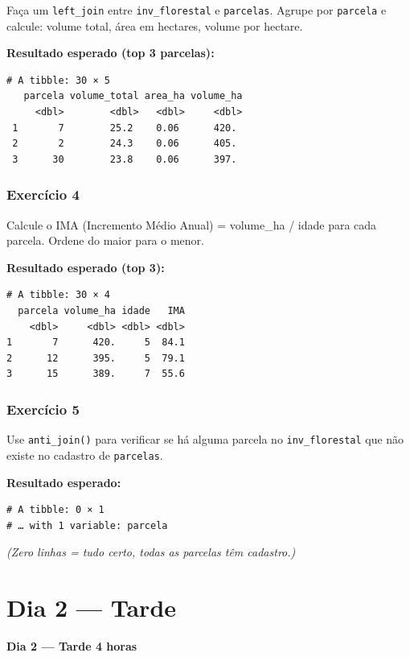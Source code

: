 \documentclass[
  letterpaper,
]{scrbook}
\begin{document}
Faça um \texttt{left\_join} entre \texttt{inv\_florestal} e
\texttt{parcelas}. Agrupe por \texttt{parcela} e calcule: volume total,
área em hectares, volume por hectare.

\textbf{Resultado esperado (top 3 parcelas):}

\begin{verbatim}
# A tibble: 30 × 5
   parcela volume_total area_ha volume_ha
     <dbl>        <dbl>   <dbl>     <dbl>
 1       7        25.2    0.06      420. 
 2       2        24.3    0.06      405. 
 3      30        23.8    0.06      397. 
\end{verbatim}

\subsection{Exercício 4}\label{exercuxedcio-4-5}

Calcule o IMA (Incremento Médio Anual) = volume\_ha / idade para cada
parcela. Ordene do maior para o menor.

\textbf{Resultado esperado (top 3):}

\begin{verbatim}
# A tibble: 30 × 4
  parcela volume_ha idade   IMA
    <dbl>     <dbl> <dbl> <dbl>
1       7      420.     5  84.1
2      12      395.     5  79.1
3      15      389.     7  55.6
\end{verbatim}

\subsection{Exercício 5}\label{exercuxedcio-5-2}

Use \texttt{anti\_join()} para verificar se há alguma parcela no
\texttt{inv\_florestal} que não existe no cadastro de \texttt{parcelas}.

\textbf{Resultado esperado:}

\begin{verbatim}
# A tibble: 0 × 1
# … with 1 variable: parcela
\end{verbatim}

\emph{(Zero linhas = tudo certo, todas as parcelas têm cadastro.)}

\chapter{Dia 2 --- Tarde}\label{dia-2-tarde-1}

\textbf{Dia 2 --- Tarde \textbar{} 4 horas}
\end{document}
